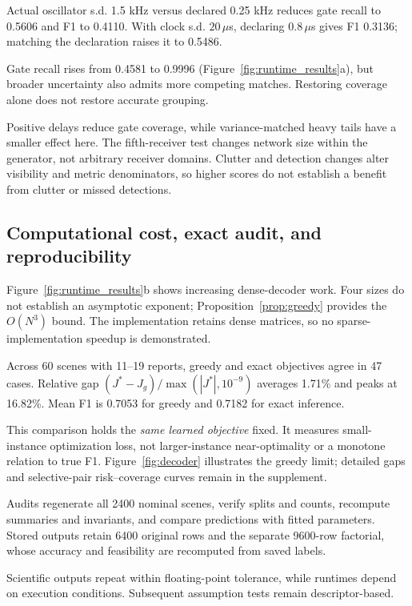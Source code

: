Actual oscillator s.d. 1.5 kHz versus declared 0.25 kHz reduces gate recall to 0.5606 and F1 to 0.4110. With clock s.d. $20\,\mu$s, declaring $0.8\,\mu$s gives F1 0.3136; matching the declaration raises it to 0.5486.

Gate recall rises from 0.4581 to 0.9996 (Figure~\ref{fig:runtime_results}a), but broader uncertainty also admits more competing matches. Restoring coverage alone does not restore accurate grouping.

Positive delays reduce gate coverage, while variance-matched heavy tails have a smaller effect here. The fifth-receiver test changes network size within the generator, not arbitrary receiver domains. Clutter and detection changes alter visibility and metric denominators, so higher scores do not establish a benefit from clutter or missed detections.

\FloatBarrier
\subsection{Computational cost, exact audit, and reproducibility}

Figure~\ref{fig:runtime_results}b shows increasing dense-decoder work. Four sizes do not establish an asymptotic exponent; Proposition~\ref{prop:greedy} provides the $O(N^3)$ bound. The implementation retains dense matrices, so no sparse-implementation speedup is demonstrated.

Across 60 scenes with 11--19 reports, greedy and exact objectives agree in 47 cases. Relative gap $(J^*-J_g)/\max(|J^*|,10^{-9})$ averages 1.71\% and peaks at 16.82\%. Mean F1 is 0.7053 for greedy and 0.7182 for exact inference.

This comparison holds the \emph{same learned objective} fixed. It measures small-instance optimization loss, not larger-instance near-optimality or a monotone relation to true F1. Figure~\ref{fig:decoder} illustrates the greedy limit; detailed gaps and selective-pair risk--coverage curves remain in the supplement.

Audits regenerate all 2400 nominal scenes, verify splits and counts, recompute summaries and invariants, and compare predictions with fitted parameters. Stored outputs retain 6400 original rows and the separate 9600-row factorial, whose accuracy and feasibility are recomputed from saved labels.

Scientific outputs repeat within floating-point tolerance, while runtimes depend on execution conditions. Subsequent assumption tests remain descriptor-based.


